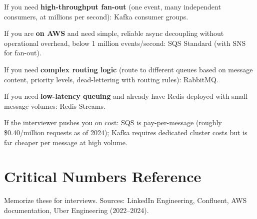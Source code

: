 \documentclass[11pt,a4paper]{article}
\begin{document}
If you need \textbf{high-throughput fan-out} (one event, many independent consumers, at millions per second): Kafka consumer groups.

If you are \textbf{on AWS} and need simple, reliable async decoupling without operational overhead, below 1 million events/second: SQS Standard (with SNS for fan-out).

If you need \textbf{complex routing logic} (route to different queues based on message content, priority levels, dead-lettering with routing rules): RabbitMQ.

If you need \textbf{low-latency queuing} and already have Redis deployed with small message volumes: Redis Streams.

If the interviewer pushes you on cost: SQS is pay-per-message (roughly \$0.40/million requests as of 2024); Kafka requires dedicated cluster costs but is far cheaper per message at high volume.

\section{Critical Numbers Reference}

Memorize these for interviews. Sources: LinkedIn Engineering, Confluent, AWS documentation, Uber Engineering (2022--2024).
\end{document}
